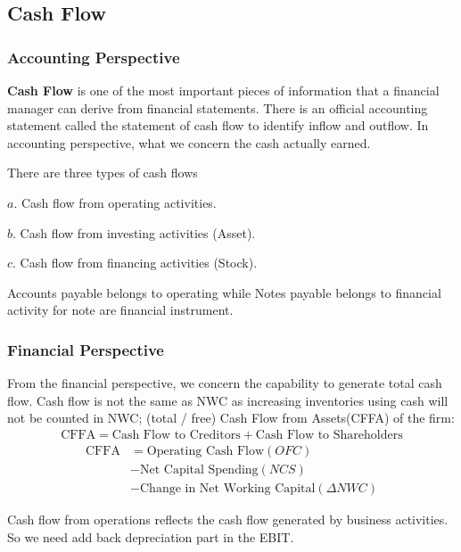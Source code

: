 \documentclass[10pt, a4paper]{article}
\begin{document}
    \subsection{Cash Flow} 
        \subsubsection{Accounting Perspective}
        \textbf{Cash Flow} is one of the most important pieces of information that a financial manager can derive from financial statements. There is an official accounting statement called the statement of cash flow to identify inflow and outflow. In accounting perspective, what we concern the cash actually earned. 

        There are three types of cash flows 

        $a$. Cash flow from operating activities. 

        $b$. Cash flow from investing activities (Asset). 

        $c$. Cash flow from financing activities (Stock). 

        Accounts payable belongs to operating while Notes payable belongs to financial activity for note are financial instrument. 
        
        \subsubsection{Financial Perspective}
        From the financial perspective, we concern the capability to generate total cash flow. Cash flow is not the same as NWC as increasing inventories using cash will not be counted in NWC; (total / free) Cash Flow from Assets(CFFA) of the firm:   
        \begin{align*}
            \text{CFFA} = \text{Cash\ Flow\ to\ Creditors} + \text{Cash\ Flow\ to\ Shareholders}
        \end{align*}
        \begin{align*}
            \text{CFFA} &= \text{Operating\ Cash\ Flow}(OFC) \\
                 &- \text{Net\ Capital\ Spending} (NCS)\\
                 &- \text{Change\ in\ Net\ Working\ Capital} (\Delta NWC) 
        \end{align*}

        Cash flow from operations reflects the cash flow generated by business activities. So we need add back depreciation part in the EBIT.
    
\end{document}

